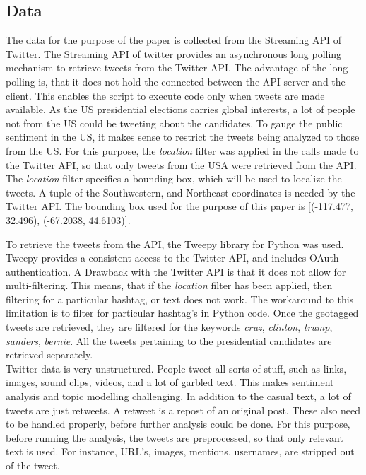 \documentclass[twoside]{article}
\begin{document}
\begin{multicols}{2}
\section{Data}
The data for the purpose of the paper is collected from the Streaming API of Twitter. The Streaming API of twitter provides an asynchronous long polling mechanism to retrieve tweets from the Twitter API. The advantage of the long polling is, that it does not hold the connected between the API server and the client. This enables the script to execute code only when tweets are made available. As the US presidential elections carries global interests, a lot of people not from the US could be tweeting about the candidates. To gauge the public sentiment in the US, it makes sense to restrict the tweets being analyzed to those from the US. For this purpose, the \textit{location} filter was applied in the calls made to the Twitter API, so that only tweets from the USA were retrieved from the API. The \textit{location} filter specifies a bounding box, which will be used to localize the tweets. A tuple of the Southwestern, and Northeast coordinates is needed by the Twitter API. The bounding box used for the purpose of this paper is [(-117.477, 32.496), (-67.2038, 44.6103)].

To retrieve the tweets from the API, the Tweepy\cite{Tweepy} library for Python was used. Tweepy provides a consistent access to the Twitter API, and includes OAuth authentication. A Drawback with the Twitter API is that it does not allow for multi-filtering. This means, that if the \textit{location} filter has been applied, then filtering for a particular hashtag, or text does not work. The workaround to this limitation is to filter for particular hashtag's in Python code. Once the geotagged tweets are retrieved, they are filtered for the keywords \textit{cruz}, \textit{clinton}, \textit{trump}, \textit{sanders}, \textit{bernie}. All the tweets pertaining to the presidential candidates are retrieved separately. \\

Twitter data is very unstructured. People tweet all sorts of stuff, such as links, images, sound clips, videos, and a lot of garbled text. This makes sentiment analysis and topic modelling challenging. In addition to the casual text, a lot of tweets are just retweets. A retweet is a repost of an original post. These also need to be handled properly, before further analysis could be done. For this purpose, before running the analysis, the tweets are preprocessed, so that only relevant text is used. For instance, URL's, images, mentions, usernames, are stripped out of the tweet.


\end{multicols}
\end{document}
